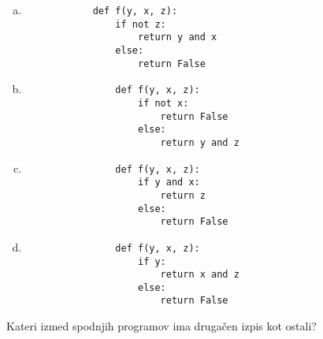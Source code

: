 \documentclass[arhiv, 10pt]{../izpit}
\begin{document}
        \begin{multicols}{2}
        \begin{enumerate}[(a)]
\item 
            \begin{verbatim}
            def f(y, x, z):
                if not z:
                    return y and x
                else:
                    return False
            \end{verbatim}
        
\item 
                \begin{verbatim}
                def f(y, x, z):
                    if not x:
                        return False
                    else:
                        return y and z
                \end{verbatim}
            
\item 
                \begin{verbatim}
                def f(y, x, z):
                    if y and x:
                        return z
                    else:
                        return False
                \end{verbatim}
            
\item 
                \begin{verbatim}
                def f(y, x, z):
                    if y:
                        return x and z
                    else:
                        return False
                \end{verbatim}
            
\end{enumerate}

        \end{multicols}
    
        \naloga*
        
        Kateri izmed spodnjih programov ima drugačen izpis kot ostali?
    
\end{document}
